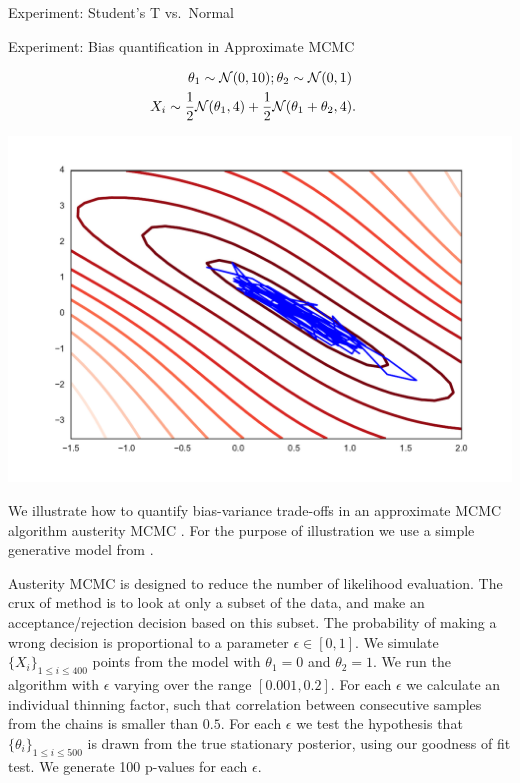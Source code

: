 \begin{frame}
\begin{columns}
\begin{column}{.32\linewidth}
\begin{block}{Experiment: Student's T vs.\ Normal}
\end{block}
\vspace{-0.75cm}


\begin{block}{Experiment: Bias quantification in Approximate MCMC}

 
\begin{minipage}{.45\linewidth}
\begin{align*}
\theta_{1}\sim{\cal N}(0,10);\theta_{2}\sim{\cal N}(0,1)\\
X_{i}\sim\frac{1}{2}{\cal N}(\theta_{1},4)+\frac{1}{2}{\cal N}(\theta_{1}+\theta_{2},4) & .
\end{align*}
\end{minipage}
\begin{minipage}{.45\linewidth}
\includegraphics[width=\textwidth]{../../presentation/img/sgld_trace_and_density.pdf}
\end{minipage}

We  illustrate how to quantify bias-variance trade-offs in an approximate MCMC algorithm austerity MCMC \cite{korattikara2013austerity}.
For the purpose of illustration we use a simple generative model from \cite{gorham2015measuring,Welling2011}.

% 
\footnotesize
Austerity MCMC is designed to reduce the number
of likelihood evaluation. The crux of method is to look at only a subset of the data,
and make an acceptance/rejection decision based on this subset. The
probability of making a wrong decision is proportional to a parameter
$\epsilon\in[0,1]$. We simulate $\{X_{i}\}_{1\leq i\leq400}$ points from the model
with $\theta_{1}=0$ and $\theta_{2}=1$. We run the algorithm with $\epsilon$ varying
over the range $[0.001,0.2]$. For each $\epsilon$ we calculate an
individual thinning factor, such that correlation between consecutive
 samples from the chains is smaller than $0.5$. For each $\epsilon$ we test the
hypothesis that $\{\theta_{i}\}_{1\leq i\leq500}$ is drawn from the
true stationary posterior, using our goodness of fit test. We generate
100 p-values for each $\epsilon$.



\end{block}
\end{column}
\end{columns}
\end{frame}
